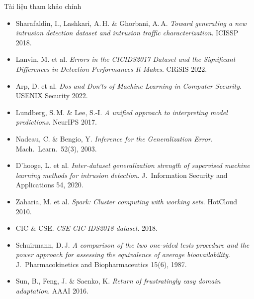 \documentclass[aspectratio=169, 11pt]{beamer}
\begin{document}
\begin{frame}{Tài liệu tham khảo chính}
  \begin{itemize}\scriptsize
    \setlength{\itemsep}{0.1em}
    \item[{[1]}] Sharafaldin, I., Lashkari, A.\,H. \& Ghorbani, A.\,A.
          \emph{Toward generating a new intrusion detection dataset and
          intrusion traffic characterization}. ICISSP 2018.
          \hfill{}
    \item[{[2]}] Lanvin, M. et al. \emph{Errors in the CICIDS2017 Dataset and the
          Significant Differences in Detection Performances It Makes}.
          CRiSIS 2022.
          \hfill{}
    \item[{[3]}] Arp, D. et al. \emph{Dos and Don'ts of Machine Learning in Computer
          Security}. USENIX Security 2022.
          \hfill{}
    \item[{[4]}] Lundberg, S.\,M. \& Lee, S.-I. \emph{A unified approach to
          interpreting model predictions}. NeurIPS 2017.
          \hfill{}
    \item[{[5]}] Nadeau, C. \& Bengio, Y. \emph{Inference for the Generalization
          Error}. Mach.\ Learn.\ 52(3), 2003.
          \hfill{}
    \item[{[6]}] D'hooge, L. et al. \emph{Inter-dataset generalization strength of
          supervised machine learning methods for intrusion detection}.
          J.\ Information Security and Applications 54, 2020.
          \hfill{}
    \item[{[7]}] Zaharia, M. et al. \emph{Spark: Cluster computing with working
          sets}. HotCloud 2010.
          \hfill{}
    \item[{[8]}] CIC \& CSE. \emph{CSE-CIC-IDS2018 dataset}. 2018.
          \hfill{}
    \item[{[9]}] Schuirmann, D.\,J. \emph{A comparison of the two one-sided tests
          procedure and the power approach for assessing the equivalence of
          average bioavailability}. J.\ Pharmacokinetics and
          Biopharmaceutics 15(6), 1987.
          \hfill{}
    \item[{[10]}] Sun, B., Feng, J. \& Saenko, K. \emph{Return of frustratingly
          easy domain adaptation}. AAAI 2016.
          \hfill{}
  \end{itemize}
\end{frame}
\end{document}
